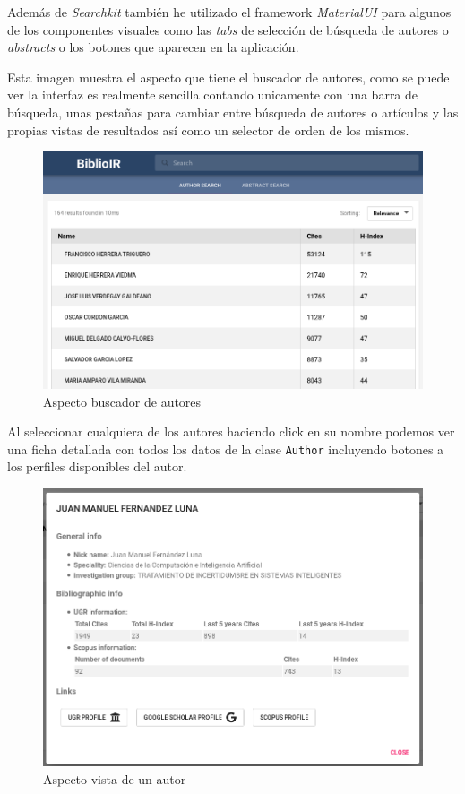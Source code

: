 Además de \textit{Searchkit} también he utilizado el \gls{framework} \textit{MaterialUI} para algunos de los componentes visuales como las \textit{tabs} de selección de búsqueda de autores o \textit{abstracts} o los botones que aparecen en la aplicación.

Esta imagen muestra el aspecto que tiene el buscador de autores, como se puede ver la interfaz es realmente sencilla contando unicamente con una barra de búsqueda, unas pestañas para cambiar entre búsqueda de autores o artículos y las propias vistas de resultados así como un selector de orden de los mismos.


\begin{figure}[h]
	
	\centering
	\includegraphics[width=\linewidth]{imagenes/AspectoBuscadorAutores}
	\caption{Aspecto buscador de autores}
\end{figure}
\newpage
Al seleccionar cualquiera de los autores haciendo click en su nombre podemos ver una ficha detallada con todos los datos de la clase \texttt{Author} incluyendo botones a los perfiles disponibles del autor.

\begin{figure}[h]
	
	\centering
	\includegraphics[width=\linewidth]{imagenes/AspectoVistaAutor}
	\caption{Aspecto vista de un autor}
\end{figure}

